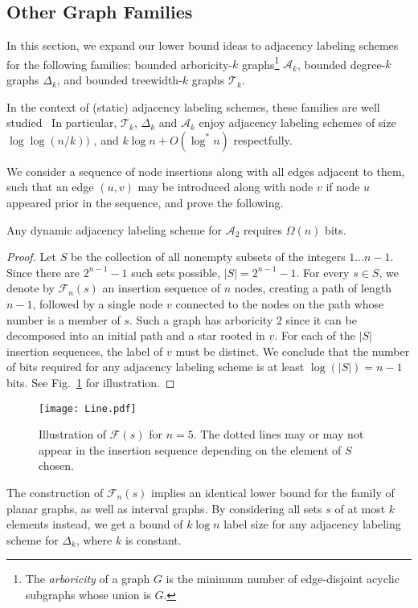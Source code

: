 \documentclass{llncs}
\begin{document}
\subsection{Other Graph Families}\label{sec-other-graphs}
In this section, we expand our lower bound ideas to adjacency labeling schemes for the  following families: bounded arboricity-$k$ graphs\footnote{The \emph{arboricity} of a graph $G$  is the minimum number of edge-disjoint acyclic subgraphs whose union is $G$.} $\mathcal{A}_k$,  bounded degree-$k$ graphs $\Delta_k$, and  bounded treewidth-$k$ graphs $\mathcal{T}_k$.

In the context of (static) adjacency  labeling schemes,  these families  are   well studied~\cite{Kannan92,Alstrup02,gavoille2007shorter,chung1990universal,Adjiasvhili14}
In particular,  $\mathcal{T}_k$, $\Delta_k$ and  $\mathcal{A}_k$  enjoy  adjacency labeling schemes of size $\log \log (n/k))$ \cite{gavoille2007shorter}, and $k \log n+O(\log^* n)$ \cite{Alstrup02} respectfully.

We consider a sequence of node insertions along with all edges adjacent to them, such that an edge $(u,v)$ may be introduced along with node $v$ if  node $u$ appeared prior in the sequence, and prove the following.
\begin{theorem}\label{theorem:lower-arboricity}
 Any dynamic adjacency labeling scheme for  $\mathcal{A}_2$ requires $\Omega(n)$ bits.
\end{theorem}
\begin{proof}
Let $S$ be the collection of all  nonempty  subsets  of  the integers $1 \dots n-1$.
Since there are $2^{n-1}-1$ such sets possible, $\vert S \vert = 2^{n-1}-1$.
For every $s \in S$, we denote  by $\mathcal{F}_n(s)$ an  insertion sequence   of  $n$ nodes, creating  a path of length $n-1$, followed by  a single node $v$ connected to the nodes on the path whose number is a member of $s$.
Such a graph has  arboricity $2$ since it can be decomposed into an initial path and a star rooted in $v$.
For each of the $|S|$  insertion sequences, the label of $v$ must be distinct.
We  conclude that the number of bits required for any adjacency labeling scheme
is at least $\log(|S|)= n-1$ bits.
See Fig.~\ref{fig:AdjLowerBoundGraphs} for illustration. 
\end{proof}
\vspace*{-5ex}
			\begin{figure}
				\centering
				\texttt{[image: Line.pdf]}
				\caption{Illustration of $\mathcal{F}(s)$ for $n=5$. The dotted lines may or may not appear in the insertion sequence depending on the element of $S$ chosen. }
				\label{fig:AdjLowerBoundGraphs}
			\end{figure}
\vspace*{-2ex}
The construction of  $\mathcal{F}_n(s)$ implies an identical lower
bound for the family of planar graphs, as well as interval graphs. By
 considering all sets $s$ of at most $k$ elements instead, we get
a bound of $k \log n$ label size for any adjacency labeling scheme for $\Delta_k$, where $k$ is constant.
\end{document}
